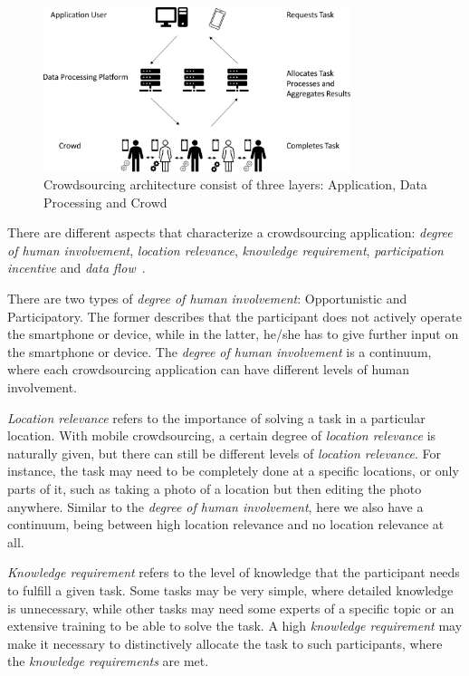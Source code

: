 \begin{figure}[htbp]
  \centering
  \includegraphics[width=0.8\textwidth]{fig/crowdsourcing.pdf}
  \caption{Crowdsourcing architecture consist of three layers: Application, Data Processing and Crowd}
\end{figure}
\label{fig:crowdsourcing}

There are different aspects that characterize a crowdsourcing application: \textit{degree of human involvement}, \textit{location relevance}, \textit{knowledge requirement}, \textit{participation incentive} and \textit{data flow}~\cite{ray2023survey,kong2019mobile}.

There are two types of \textit{degree of human involvement}: Opportunistic and Participatory.
The former describes that the participant does not actively operate the smartphone or device, while in the latter, he/she has to give further input on the smartphone or device.
The \textit{degree of human involvement} is a continuum, where each crowdsourcing application can have different levels of human involvement.

\textit{Location relevance} refers to the importance of solving a task in a particular location.
With mobile crowdsourcing, a certain degree of \textit{location relevance} is naturally given, but there can still be different levels of \textit{location relevance}.
For instance, the task may need to be completely done at a specific locations, or only parts of it, such as taking a photo of a location but then editing the photo anywhere.
Similar to the \textit{degree of human involvement}, here we also have a continuum, being between high location relevance and no location relevance at all.

\textit{Knowledge requirement} refers to the level of knowledge that the participant needs to fulfill a given task.
Some tasks may be very simple, where detailed knowledge is unnecessary, while other tasks may need some experts of a specific topic or an extensive training to be able to solve the task.
A high \textit{knowledge requirement} may make it necessary to distinctively allocate the task to such participants, where the \textit{knowledge requirements} are met.

